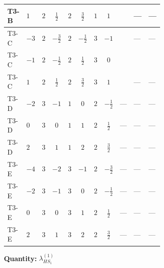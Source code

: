 \documentclass[8pt]{article}
\begin{document}
\begin{landscape}
\begin{longtable}{@{}llcccccc >{\raggedright\arraybackslash}p{0.21\linewidth} >{\raggedright\arraybackslash}p{0.21\linewidth} >{\raggedright\arraybackslash}p{0.21\linewidth}@{}}
\midrule
T3-B & $1$ & $2$ & $\frac{1}{2}$ & $2$ & $\frac{3}{2}$ & $1$ & $1$ & \scriptsize\adjustbox{max width=\linewidth}{$\begin{gathered} +\frac{3 {\lambda_{HS_1}^{(A)}}^2}{4}\end{gathered}$} & --- & --- \\
\midrule
T3-C & $-3$ & $2$ & $-\frac{3}{2}$ & $2$ & $-\frac{1}{2}$ & $3$ & $-1$ & \scriptsize\adjustbox{max width=\linewidth}{$\begin{gathered} +\frac{3 {\lambda_{HS_1}^{(A)}}^2}{4}\end{gathered}$} & --- & --- \\
\midrule
T3-C & $-1$ & $2$ & $-\frac{1}{2}$ & $2$ & $\frac{1}{2}$ & $3$ & $0$ & \scriptsize\adjustbox{max width=\linewidth}{$\begin{gathered} +\frac{3 {\lambda_{HS_1}^{(A)}}^2}{4}\end{gathered}$} & \scriptsize\adjustbox{max width=\linewidth}{$\begin{gathered} +24 {\lambda_{7}} \left({\lambda_{7}}\right)^{*}\end{gathered}$} & \scriptsize\adjustbox{max width=\linewidth}{$\begin{gathered} +3 {\lambda_{11}} \left({\lambda_{H H^\dagger S_1^\dagger S_2^\dagger}^{\rm Cross}}\right)^{*}\end{gathered}$} \\
\midrule
T3-C & $1$ & $2$ & $\frac{1}{2}$ & $2$ & $\frac{3}{2}$ & $3$ & $1$ & \scriptsize\adjustbox{max width=\linewidth}{$\begin{gathered} +\frac{3 {\lambda_{HS_1}^{(A)}}^2}{4}\end{gathered}$} & --- & --- \\
\midrule
T3-D & $-2$ & $3$ & $-1$ & $1$ & $0$ & $2$ & $-\frac{1}{2}$ & --- & --- & --- \\
\midrule
T3-D & $0$ & $3$ & $0$ & $1$ & $1$ & $2$ & $\frac{1}{2}$ & --- & --- & --- \\
\midrule
T3-D & $2$ & $3$ & $1$ & $1$ & $2$ & $2$ & $\frac{3}{2}$ & --- & --- & --- \\
\midrule
T3-E & $-4$ & $3$ & $-2$ & $3$ & $-1$ & $2$ & $-\frac{3}{2}$ & --- & --- & --- \\
\midrule
T3-E & $-2$ & $3$ & $-1$ & $3$ & $0$ & $2$ & $-\frac{1}{2}$ & --- & --- & --- \\
\midrule
T3-E & $0$ & $3$ & $0$ & $3$ & $1$ & $2$ & $\frac{1}{2}$ & --- & --- & --- \\
\midrule
T3-E & $2$ & $3$ & $1$ & $3$ & $2$ & $2$ & $\frac{3}{2}$ & --- & --- & --- \\
\midrule
\bottomrule
\end{longtable}
\clearpage
\noindent\textbf{Quantity: }$\lambda_{HS_1}^{(1)}$\par\smallskip

\end{landscape}
\end{document}
